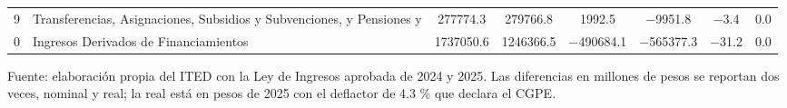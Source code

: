 \begin{table}[htbp]
{\begin{tabular}{llSSSSSS}
\num{9} & {Transferencias, Asignaciones, Subsidios y Subvenciones, y Pensiones y} & \num{277774.3} & \num{279766.8} & \num{1992.5} & \num{-9951.8} & \num{-3.4} & \num{0.0} \\
\num{0} & {Ingresos Derivados de Financiamientos} & \num{1737050.6} & \num{1246366.5} & \num{-490684.1} & \num{-565377.3} & \num{-31.2} & \num{0.0} \\
\bottomrule
\end{tabular}
}
\par\vspace{2pt}\footnotesize Fuente: elaboración propia del ITED con la Ley de Ingresos aprobada de 2024 y 2025. Las diferencias en millones de pesos se reportan dos veces, nominal y real; la real está en pesos de 2025 con el deflactor de 4.3 \% que declara el CGPE.
\end{table}
